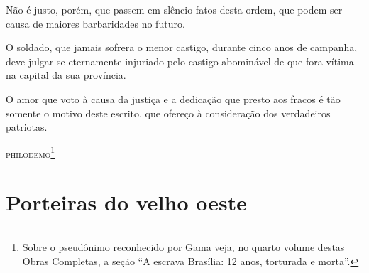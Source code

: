 Não é justo, porém, que passem em slêncio fatos desta ordem, que podem
ser causa de maiores barbaridades no futuro.

O soldado, que jamais sofrera o menor castigo, durante cinco anos de
campanha, deve julgar-se eternamente injuriado pelo castigo abominável
de que fora vítima na capital da sua província.

O amor que voto à causa da justiça e a dedicação que presto aos fracos é
tão somente o motivo deste escrito, que ofereço à consideração dos
verdadeiros patriotas.

\begin{flushright}
\textsc{philodemo}\footnote{Sobre o pseudônimo reconhecido por Gama veja, no
  quarto volume destas Obras Completas, a seção ``A escrava Brasília:
  12 anos, torturada e morta''.}
\end{flushright}

\part{Porteiras do velho oeste}

